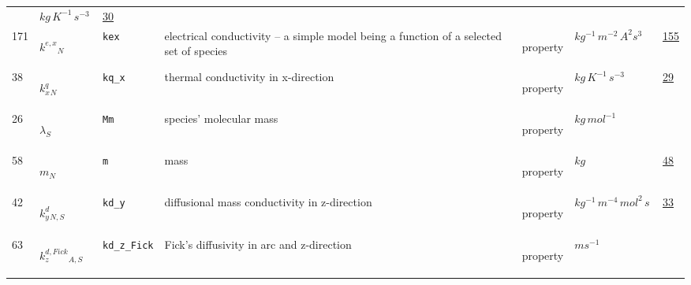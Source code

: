 \begin{longtable}{|p{1cm}|p{2.5cm}|p{4.5cm}|p{8cm}|p{3.0cm}|p{3cm}|p{1cm}|}
             & $ kg \,K^{-1} \,s^{-3} \, $
             &                 \hyperlink{"e:30"}{ 30 }
                 \\
            171
             & \hypertarget{"v:171"}{ $ {{k^{e,x}}}{_{N}} $}
             & \verb|kex|
             & electrical conductivity -- a simple model being a function of a selected set of species
             & \begin{lay}property \end{lay}
             & $ kg^{-1} \,m^{-2} \,A^{2} s^{3} \, $
             &                 \hyperlink{"e:155"}{ 155 }
                 \\
            38
             & \hypertarget{"v:38"}{ $ {{k^q_x}}{_{N}} $}
             & \verb|kq_x|
             & thermal conductivity in x-direction
             & \begin{lay}property \end{lay}
             & $ kg \,K^{-1} \,s^{-3} \, $
             &                 \hyperlink{"e:29"}{ 29 }
                 \\
            26
             & \hypertarget{"v:26"}{ $ {{\lambda}}{_{S}} $}
             & \verb|Mm|
             & species' molecular mass
             & \begin{lay}property \end{lay}
             & $ kg \,mol^{-1} \, $
             & \\
            58
             & \hypertarget{"v:58"}{ $ {m}{_{N}} $}
             & \verb|m|
             & mass
             & \begin{lay}property \end{lay}
             & $ kg \, $
             &                 \hyperlink{"e:48"}{ 48 }
                 \\
            42
             & \hypertarget{"v:42"}{ $ {{k^d_y}}{_{N, S}} $}
             & \verb|kd_y|
             & diffusional mass conductivity in z-direction
             & \begin{lay}property \end{lay}
             & $ kg^{-1} \,m^{-4} \,mol^{2} \,s \, $
             &                 \hyperlink{"e:33"}{ 33 }
                 \\
            63
             & \hypertarget{"v:63"}{ $ {{k^{d,Fick}_z}}{_{A, S}} $}
             & \verb|kd_z_Fick|
             & Fick's diffusivity in arc and z-direction 
             & \begin{lay}property \end{lay}
             & $ m s^{-1} \, $

\end{longtable}
